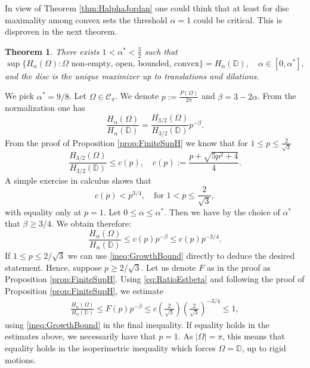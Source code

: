 \documentclass[11pt]{article}
\theoremstyle{plain}
\numberwithin{equation}{section}
\newtheorem{theorem}{Theorem}[section]
\theoremstyle{definition}
\let\oldendproof\endproof
\renewenvironment{proof}[1][\proofname]{%
\oldproof[\upshape \bfseries #1]%
}{\oldendproof}
\def \Om{\Omega}
\def \mc{\mathcal}
\def \mb{\mathbb}
\begin{document}
    
    In view of Theorem \ref{thm:HalphaJordan} one could think that at least for disc maximality among convex sets the threshold $\alpha=1$ could be critical. This is disproven in the next theorem.
    \begin{theorem}
        There exists $1<\alpha^*<\frac32$ such that
        \[
        \sup\{H_\alpha(\Om): \Om \text{ non-empty, open, bounded, convex}\}=H_\alpha(\mb D),\quad \alpha \in [0,\alpha^*],
        \]
        and the disc is the unique maximizer up to translations and dilations.
    \end{theorem}

    \begin{proof}
        We pick $\alpha^*=9/8$. Let $\Om \in \mc C_\pi$. We denote $p:=\frac{P(\Om)}{2\pi}$ and $\beta=3-2\alpha$. From the normalization one has
        \begin{equation}
            \label{eq:RatioEstbeta}
            \frac{H_\alpha(\Om)}{H_\alpha(\mb D)}=\frac{H_{3/2}(\Om)}{H_{3/2}(\mb D)}p^{-\beta}.
        \end{equation}
        From the proof of Proposition \ref{prop:FiniteSupH} we know that for $1\leq p\leq \frac{2}{\sqrt3}$
        \begin{equation}
            \label{finiteUpperBound}
            \frac{H_{3/2}(\Om)}{H_{3/2}(\mb D)}\leq c(p),\quad c(p):=\frac{p+\sqrt{5p^2+4}}{4}.
        \end{equation}
        A simple exercise in calculus shows that
        \begin{equation}
            \label{ineq:GrowthBound}
            c(p)<p^{3/4},\quad \text{for }1< p\leq \frac{2}{\sqrt 3},
        \end{equation}
        with equality only at $p=1$. Let $0\leq \alpha \leq \alpha^*$. Then we have by the choice of $\alpha^*$ that $\beta \geq 3/4$. We obtain therefore:
        \[
        \frac{H_\alpha(\Om)}{H_\alpha(\mb D)}\leq c(p)p^{-\beta}\leq c(p)p^{-3/4}.
        \]
        If $1\leq p \leq 2/\sqrt{3}$ we can use \eqref{ineq:GrowthBound} directly to deduce the desired statement. Hence, suppose $p \geq 2/\sqrt{3}$. Let us denote $F$ as in the proof as Proposition \ref{prop:FiniteSupH}. Using \eqref{eq:RatioEstbeta} and following the proof of Proposition \ref{prop:FiniteSupH}, we estimate
        \begin{align}
            \frac{H_\alpha(\Om)}{H_\alpha(\mb D)}\leq F(p)p^{-\beta}\leq c\left(\frac{2}{\sqrt{3}}\right)\left(\frac{2}{\sqrt{3}}\right)^{-3/4}\leq 1,
        \end{align}
        using \eqref{ineq:GrowthBound} in the final inequality. If equality holds in the estimates above, we necessarily have that $p=1$. As $|\Om|=\pi$, this means that equality holds in the isoperimetric inequality which forces $\Om=\mb D$, up to rigid motions.
    \end{proof}
\end{document}
